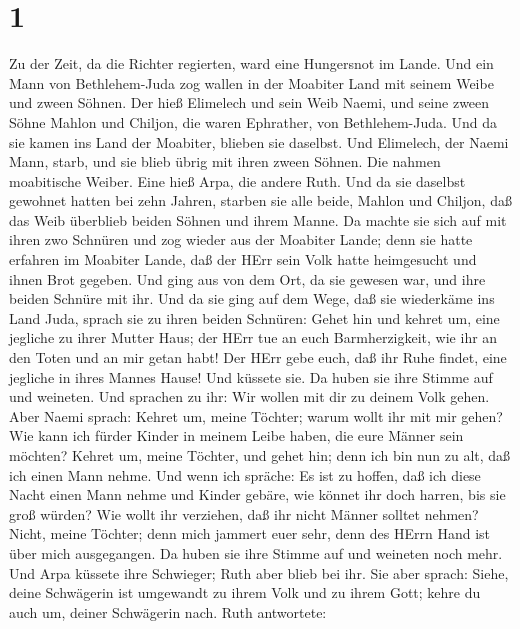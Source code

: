 \hypertarget{section}{%
\section{1}\label{section}}

 Zu der Zeit, da die Richter regierten, ward eine Hungersnot
im Lande. Und ein Mann von Bethlehem-Juda zog wallen in der Moabiter
Land mit seinem Weibe und zween Söhnen.  Der hieß Elimelech
und sein Weib Naemi, und seine zween Söhne Mahlon und Chiljon, die waren
Ephrather, von Bethlehem-Juda. Und da sie kamen ins Land der Moabiter,
blieben sie daselbst.  Und Elimelech, der Naemi Mann, starb,
und sie blieb übrig mit ihren zween Söhnen.  Die nahmen
moabitische Weiber. Eine hieß Arpa, die andere Ruth. Und da sie daselbst
gewohnet hatten bei zehn Jahren,  starben sie alle beide,
Mahlon und Chiljon, daß das Weib überblieb beiden Söhnen und ihrem
Manne.  Da machte sie sich auf mit ihren zwo Schnüren und
zog wieder aus der Moabiter Lande; denn sie hatte erfahren im Moabiter
Lande, daß der HErr sein Volk hatte heimgesucht und ihnen Brot gegeben.
 Und ging aus von dem Ort, da sie gewesen war, und ihre
beiden Schnüre mit ihr. Und da sie ging auf dem Wege, daß sie wiederkäme
ins Land Juda,  sprach sie zu ihren beiden Schnüren: Gehet
hin und kehret um, eine jegliche zu ihrer Mutter Haus; der HErr tue an
euch Barmherzigkeit, wie ihr an den Toten und an mir getan habt!
 Der HErr gebe euch, daß ihr Ruhe findet, eine jegliche in
ihres Mannes Hause! Und küssete sie. Da huben sie ihre Stimme auf und
weineten.  Und sprachen zu ihr: Wir wollen mit dir zu
deinem Volk gehen.  Aber Naemi sprach: Kehret um, meine
Töchter; warum wollt ihr mit mir gehen? Wie kann ich fürder Kinder in
meinem Leibe haben, die eure Männer sein möchten?  Kehret
um, meine Töchter, und gehet hin; denn ich bin nun zu alt, daß ich einen
Mann nehme. Und wenn ich spräche: Es ist zu hoffen, daß ich diese Nacht
einen Mann nehme und Kinder gebäre,  wie könnet ihr doch
harren, bis sie groß würden? Wie wollt ihr verziehen, daß ihr nicht
Männer solltet nehmen? Nicht, meine Töchter; denn mich jammert euer
sehr, denn des HErrn Hand ist über mich ausgegangen.  Da
huben sie ihre Stimme auf und weineten noch mehr. Und Arpa küssete ihre
Schwieger; Ruth aber blieb bei ihr.  Sie aber sprach:
Siehe, deine Schwägerin ist umgewandt zu ihrem Volk und zu ihrem Gott;
kehre du auch um, deiner Schwägerin nach.  Ruth antwortete:

